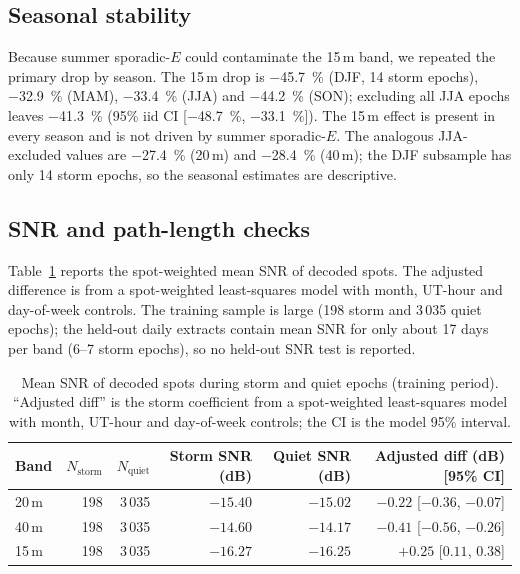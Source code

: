 \documentclass{agujournal2019}
\begin{document}
\subsection{Seasonal stability}

Because summer sporadic-$E$ could contaminate the 15\,m band, we repeated the
primary drop by season. The 15\,m drop is \SI{-45.7}{\percent} (DJF, 14 storm
epochs), \SI{-32.9}{\percent} (MAM), \SI{-33.4}{\percent} (JJA) and
\SI{-44.2}{\percent} (SON); excluding all JJA epochs leaves
\SI{-41.3}{\percent} (95\% iid CI [\SI{-48.7}{\percent},
\SI{-33.1}{\percent}]). The 15\,m effect is present in every season and is
not driven by summer sporadic-$E$. The analogous JJA-excluded values are
\SI{-27.4}{\percent} (20\,m) and \SI{-28.4}{\percent} (40\,m); the DJF
subsample has only 14 storm epochs, so the seasonal estimates are
descriptive.

\subsection{SNR and path-length checks}

Table~\ref{tab:snr} reports the spot-weighted mean SNR of decoded spots.
The adjusted difference is from a spot-weighted least-squares model with
month, UT-hour and day-of-week controls. The training sample is large
(198 storm and 3\,035 quiet epochs); the held-out daily extracts contain
mean SNR for only about 17 days per band (6--7 storm epochs), so no
held-out SNR test is reported.

\begin{table}[h]
	\centering
	\small
	\caption{Mean SNR of decoded spots during storm and quiet epochs
		(training period). ``Adjusted diff'' is the storm coefficient from
		a spot-weighted least-squares model with month, UT-hour and
		day-of-week controls; the CI is the model 95\% interval.}
	\label{tab:snr}
	\begin{tabular}{lrrrrr}
		\toprule
		Band & $N_{\text{storm}}$ & $N_{\text{quiet}}$
		& Storm SNR (dB) & Quiet SNR (dB) & Adjusted diff (dB) [95\% CI] \\
		\midrule
		20\,m & 198 & 3\,035 & $-15.40$ & $-15.02$ & $-0.22$ [$-0.36$, $-0.07$] \\
		40\,m & 198 & 3\,035 & $-14.60$ & $-14.17$ & $-0.41$ [$-0.56$, $-0.26$] \\
		15\,m & 198 & 3\,035 & $-16.27$ & $-16.25$ & $+0.25$ [$0.11$, $0.38$] \\
		\bottomrule
	\end{tabular}
\end{table}
\end{document}
